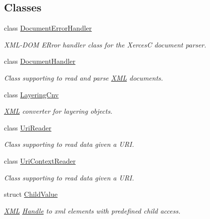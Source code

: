 \subsection*{Classes}
\begin{DoxyCompactItemize}
\item 
class \hyperlink{class_d_d4hep_1_1_x_m_l_1_1_document_error_handler}{DocumentErrorHandler}
\begin{DoxyCompactList}\small\item\em XML-\/DOM ERror handler class for the XercesC document parser. \item\end{DoxyCompactList}\item 
class \hyperlink{class_d_d4hep_1_1_x_m_l_1_1_document_handler}{DocumentHandler}
\begin{DoxyCompactList}\small\item\em Class supporting to read and parse \hyperlink{namespace_d_d4hep_1_1_x_m_l}{XML} documents. \item\end{DoxyCompactList}\item 
class \hyperlink{class_d_d4hep_1_1_x_m_l_1_1_layering_cnv}{LayeringCnv}
\begin{DoxyCompactList}\small\item\em \hyperlink{namespace_d_d4hep_1_1_x_m_l}{XML} converter for layering objects. \item\end{DoxyCompactList}\item 
class \hyperlink{class_d_d4hep_1_1_x_m_l_1_1_uri_reader}{UriReader}
\begin{DoxyCompactList}\small\item\em Class supporting to read data given a URI. \item\end{DoxyCompactList}\item 
class \hyperlink{class_d_d4hep_1_1_x_m_l_1_1_uri_context_reader}{UriContextReader}
\begin{DoxyCompactList}\small\item\em Class supporting to read data given a URI. \item\end{DoxyCompactList}\item 
struct \hyperlink{struct_d_d4hep_1_1_x_m_l_1_1_child_value}{ChildValue}
\begin{DoxyCompactList}\small\item\em \hyperlink{namespace_d_d4hep_1_1_x_m_l}{XML} \hyperlink{class_d_d4hep_1_1_handle}{Handle} to xml elements with predefined child access. \item\end{DoxyCompactList}\item 

\end{DoxyCompactItemize}
